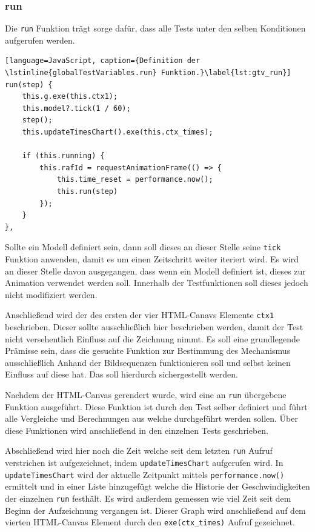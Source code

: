 \subsubsection{run}

Die \lstinline{run} Funktion trägt sorge dafür, dass alle Tests unter den selben Konditionen aufgerufen werden.

\begin{lstlisting}[language=JavaScript, caption={Definition der \lstinline{globalTestVariables.run} Funktion.}\label{lst:gtv_run}]
run(step) {
    this.g.exe(this.ctx1);
    this.model?.tick(1 / 60);
    step();
    this.updateTimesChart().exe(this.ctx_times);

    if (this.running) {
        this.rafId = requestAnimationFrame(() => {
            this.time_reset = performance.now();
            this.run(step)
        });
    }
},
\end{lstlisting}

Sollte ein  Modell definiert sein, dann soll dieses an dieser Stelle seine \lstinline{tick} Funktion anwenden, damit es um einen Zeitschritt weiter iteriert wird.
Es wird an dieser Stelle davon ausgegangen, dass wenn ein  Modell definiert ist, dieses zur Animation verwendet werden soll.
Innerhalb der Testfunktionen soll dieses jedoch nicht modifiziert werden.

Anschließend wird der  des ersten der vier HTML-Canavs Elemente \lstinline{ctx1} beschrieben.
Dieser sollte ausschließlich hier beschrieben werden, damit der Test nicht versehentlich Einfluss auf die Zeichnung nimmt.
Es soll eine grundlegende Prämisse sein, dass die gesuchte Funktion zur Bestimmung des Mechanismus ausschließlich Anhand der Bildsequenzen funktionieren soll und selbst keinen Einfluss auf diese hat.
Das soll hierdurch sichergestellt werden.

Nachdem der HTML-Canvas gerendert wurde, wird eine an \lstinline{run} übergebene Funktion ausgeführt.
Diese Funktion ist durch den Test selber definiert und führt alle Vergleiche und Berechnungen aus welche durchgeführt werden sollen.
Über diese Funktionen wird anschließend in den einzelnen Tests geschrieben.

Abschließend wird hier noch die Zeit welche seit dem letzten \lstinline{run} Aufruf verstrichen ist aufgezeichnet, indem \lstinline{updateTimesChart} aufgerufen wird.
In \lstinline{updateTimesChart} wird der aktuelle Zeitpunkt mittels \lstinline{performance.now()} %
ermittelt und in einer Liste hinzugefügt welche die Historie der Geschwindigkeiten der einzelnen \lstinline{run} festhält.
Es wird außerdem gemessen wie viel Zeit seit dem Beginn der Aufzeichnung vergangen ist.
Dieser Graph wird anschließend auf dem vierten HTML-Canvas Element durch den \lstinline{exe(ctx_times)} Aufruf gezeichnet.


